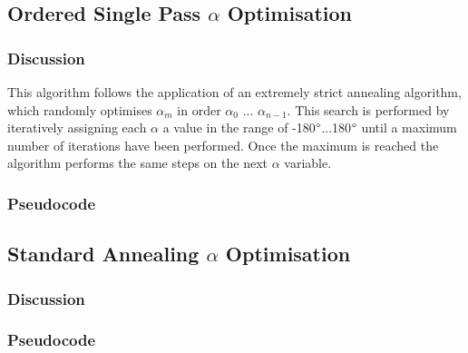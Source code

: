 \documentclass[conference]{IEEEtran}
\begin{document}
\begin{algorithm}
  
\end{algorithm}

\begin{algorithm}
  
\end{algorithm}

\begin{algorithm}
  
\end{algorithm}


\subsection{Ordered Single Pass $\alpha$ Optimisation}
\subsubsection{Discussion}

This algorithm follows the application of an extremely strict annealing algorithm, which randomly
optimises $\alpha_m$ in order $\alpha_0$ ... $\alpha_{n-1}$. This search is performed by iteratively
assigning each $\alpha$ a value in the range of {-180$\degree$...180$\degree$} until a maximum number of
iterations have been performed. Once the maximum is reached the algorithm performs the same steps on the 
next $\alpha$ variable.

\subsubsection{Pseudocode}


\subsection{Standard Annealing $\alpha$ Optimisation}
\subsubsection{Discussion}
\subsubsection{Pseudocode}
\end{document}
